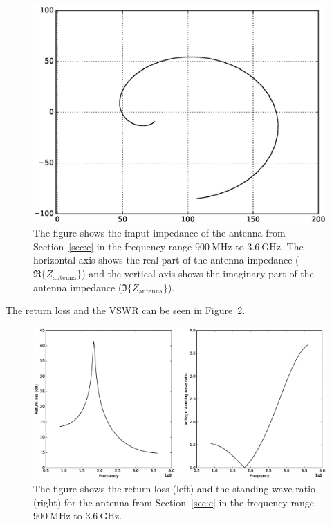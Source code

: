 \documentclass{article}
\begin{document}
\begin{figure}
  \centering
  \includegraphics[width=\textwidth]{impedance2.eps}
  \caption{The figure shows the imput impedance of the antenna from Section~\ref{sec:c} in the frequency range $\SI{900}{\mega\hertz}$ to $\SI{3.6}{\giga\hertz}$. The horizontal axis shows the real part of the antenna impedance ($\Re\{Z_{\text{antenna}}\}$) and the vertical axis shows the imaginary part of the antenna impedance ($\Im\{Z_{\text{antenna}}\}$).}
  \label{fig:imp2}
\end{figure}
The return loss and the VSWR can be seen in Figure~\ref{fig:ans2}.
\begin{figure}
  \centering
  \includegraphics[width=\textwidth]{Answers2.eps}
  \caption{The figure shows the return loss (left) and the standing wave ratio (right) for the antenna from Section~\ref{sec:c} in the frequency range $\SI{900}{\mega\hertz}$ to $\SI{3.6}{\giga\hertz}$.}
  \label{fig:ans2}
\end{figure}
\end{document}

